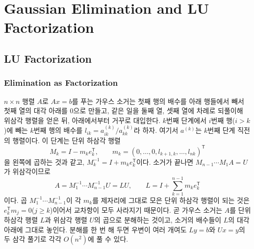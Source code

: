 \chapter{Gaussian Elimination and LU Factorization}
\label{ch:lu}


\section{LU Factorization}
\label{sec:lu-factorization}

\subsection{Elimination as Factorization}

$n\times n$ 행렬 $A$로 $Ax=b$를 푸는 가우스 소거는 첫째 행의 배수를 아래 행들에서 빼서 첫째 열의 대각 아래를 $0$으로 만들고, 같은 일을 둘째 열, 셋째 열에 차례로 되풀이해 위삼각 행렬을 얻은 뒤, 아래에서부터 거꾸로 대입한다. $k$번째 단계에서 $i$번째 행($i>k$)에 빼는 $k$번째 행의 배수를 $l_{ik}=a_{ik}^{(k)}/a_{kk}^{(k)}$라 하자. 여기서 $a^{(k)}$는 $k$번째 단계 직전의 행렬이다. 이 단계는 단위 하삼각 행렬
\[
M_k=I-m_ke_k^{\mathsf T},\qquad m_k=(0,\dots,0,l_{k+1,k},\dots,l_{nk})^{\mathsf T}
\]
을 왼쪽에 곱하는 것과 같고, $M_k^{-1}=I+m_ke_k^{\mathsf T}$이다. 소거가 끝나면 $M_{n-1}\cdots M_1A=U$가 위삼각이므로
\[
A=M_1^{-1}\cdots M_{n-1}^{-1}U=LU,\qquad L=I+\sum_{k=1}^{n-1}m_ke_k^{\mathsf T}
\]
이다. 곱 $M_1^{-1}\cdots M_{n-1}^{-1}$이 각 $m_k$를 제자리에 그대로 모은 단위 하삼각 행렬이 되는 것은 $e_k^{\mathsf T}m_j=0$($j\ge k$)이어서 교차항이 모두 사라지기 때문이다. 곧 가우스 소거는 $A$를 단위 하삼각 행렬 $L$과 위삼각 행렬 $U$의 곱으로 분해하는 것이고, 소거의 배수들이 $L$의 대각 아래에 그대로 놓인다. 분해를 한 번 해 두면 우변이 여러 개여도 $Ly=b$와 $Ux=y$의 두 삼각 풀기로 각각 $O(n^2)$에 풀 수 있다.

